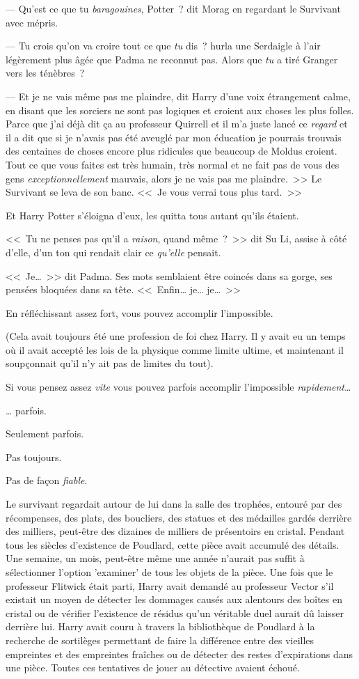 --- Qu'est ce que tu \emph{baragouines}, Potter~? dit Morag en regardant le Survivant avec mépris.

--- Tu crois qu'on va croire tout ce que \emph{tu} dis~? hurla une Serdaigle à l'air légèrement plus âgée que Padma ne reconnut pas. Alors que \emph{tu} a tiré Granger vers les ténèbres~?

--- Et je ne vais même pas me plaindre, dit Harry d'une voix étrangement calme, en disant que les sorciers ne sont pas logiques et croient aux choses les plus folles. Parce que j'ai déjà dit ça au professeur Quirrell et il m'a juste lancé ce \emph{regard} et il a dit que si je n'avais pas été aveuglé par mon éducation je pourrais trouvais des centaines de choses encore plus ridicules que beaucoup de Moldus croient. Tout ce que vous faites est très humain, très normal et ne fait pas de vous des gens \emph{exceptionnellement} mauvais, alors je ne vais pas me plaindre.~>> Le Survivant se leva de son banc. <<~Je vous verrai tous plus tard.~>>

Et Harry Potter s'éloigna d'eux, les quitta tous autant qu'ils étaient.

<<~Tu ne penses pas qu'il a \emph{raison}, quand même~?~>> dit Su Li, assise à côté d'elle, d'un ton qui rendait clair ce \emph{qu'elle} pensait.

<<~Je…~>> dit Padma. Ses mots semblaient être coincés dans sa gorge, ses pensées bloquées dans sa tête. <<~Enfin… je… je…~>>

\later

En réfléchissant assez fort, vous pouvez accomplir l'impossible.

(Cela avait toujours été une profession de foi chez Harry. Il y avait eu un temps où il avait accepté les lois de la physique comme limite ultime, et maintenant il soupçonnait qu'il n'y ait pas de limites du tout).

Si vous pensez assez \emph{vite} vous pouvez parfois accomplir l'impossible \emph{rapidement}…

… parfois.

Seulement parfois.

Pas toujours.

Pas de façon \emph{fiable}.

Le survivant regardait autour de lui dans la salle des trophées, entouré par des récompenses, des plats, des boucliers, des statues et des médailles gardés derrière des milliers, peut-être des dizaines de milliers de présentoirs en cristal. Pendant tous les siècles d'existence de Poudlard, cette pièce avait accumulé des détails. Une semaine, un mois, peut-être même une année n'aurait pas suffit à sélectionner l'option 'examiner' de tous les objets de la pièce. Une fois que le professeur Flitwick était parti, Harry avait demandé au professeur Vector s'il existait un moyen de détecter les dommages causés aux alentours des boîtes en cristal ou de vérifier l'existence de résidus qu'un véritable duel aurait dû laisser derrière lui. Harry avait couru à travers la bibliothèque de Poudlard à la recherche de sortilèges permettant de faire la différence entre des vieilles empreintes et des empreintes fraîches ou de détecter des restes d'expirations dans une pièce. Toutes ces tentatives de jouer au détective avaient échoué.

